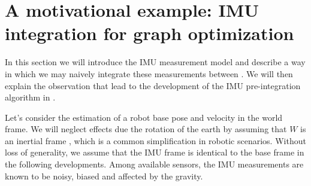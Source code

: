 




  
\section{A motivational example: IMU integration for graph optimization}
In this section we will introduce the IMU measurement model and describe a way in which we may naively integrate these measurements between \keyframes.
We will then explain the observation that lead to the development of the IMU pre-integration algorithm in \cite{lupton-09}.

Let's consider the estimation of a robot base pose and velocity in the world frame. We will neglect effects due the rotation of the earth by assuming 
that $W$ is an inertial frame \cite{forster2017-TRO}, which
is a common simplification in robotic scenarios.  Without loss of generality, we assume that the IMU frame is identical to the base frame in the following developments.
Among available sensors, the IMU measurements are known to be noisy, biased and affected by the gravity.

